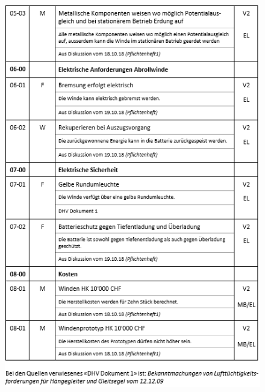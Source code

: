 \begin{figure}[H]
	\begin{center}
		\includegraphics[width=155mm]{appendix/Anforderungen5.png}
	\end{center}
\end{figure}
